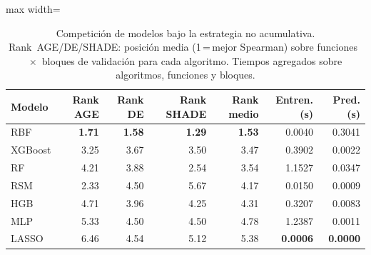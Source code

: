 \begin{table}[H]
    \centering
    \small
    \begin{adjustbox}{max width=\textwidth}
\begin{tabular}{l r r r r r r}
\toprule
\textbf{Modelo} & \textbf{Rank AGE} & \textbf{Rank DE} & \textbf{Rank SHADE} & \textbf{Rank medio} & \textbf{Entren. (s)} & \textbf{Pred. (s)} \\
\midrule
RBF & \textbf{1.71} & \textbf{1.58} & \textbf{1.29} & \textbf{1.53} & 0.0040 & 0.3041 \\
XGBoost & 3.25 & 3.67 & 3.50 & 3.47 & 0.3902 & 0.0022 \\
RF & 4.21 & 3.88 & 2.54 & 3.54 & 1.1527 & 0.0347 \\
RSM & 2.33 & 4.50 & 5.67 & 4.17 & 0.0150 & 0.0009 \\
HGB & 4.71 & 3.96 & 4.25 & 4.31 & 0.3207 & 0.0083 \\
MLP & 5.33 & 4.50 & 4.50 & 4.78 & 1.2387 & 0.0011 \\
LASSO & 6.46 & 4.54 & 5.12 & 5.38 & \textbf{0.0006} & \textbf{0.0000} \\
\bottomrule
\end{tabular}
    \end{adjustbox}
    \caption{Competición de modelos bajo la estrategia no acumulativa. Rank~AGE/DE/SHADE: posición media (1\,=\,mejor Spearman) sobre funciones~$\times$~bloques de validación para cada algoritmo. Tiempos agregados sobre algoritmos, funciones y bloques.}
    \label{tab:comparativa_modelos_offline_v2}
\end{table}